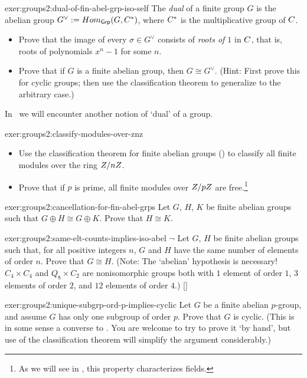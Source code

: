 \begin{exer}{}{exer:groups2:dual-of-fin-abel-grp-iso-self}
  The \emph{dual} of a finite group $G$ is the abelian group
  $G^\vee := Hom_{\textsf{Grp}}(G, C^*)$, where $C^*$ is the
  multiplicative group of $C$.
  \begin{itemize}
  \item Prove that the image of every $\sigma \in G^\vee$ consists of
    \emph{roots of $1$} in $C$, that is, roots of polynomials
    $x^n - 1$ for some $n$.
  \item Prove that if $G$ is a finite abelian group, then
    $G \cong G^\vee$. (Hint: First prove this for cyclic groups; then
    use the classification theorem to generalize to the arbitrary
    case.)
  \end{itemize}
  In~ we will encounter another
  notion of `dual' of a group.
\end{exer}
\begin{exer}{}{exer:groups2:classify-modules-over-znz}
  \begin{itemize}
  \item Use the classification theorem for finite abelian groups
    () to classify all finite modules over the
    ring $Z/nZ$.
  \item Prove that if $p$ is prime, all finite modules over $Z/pZ$
    are free.\footnote{As we will see in , this
      property characterizes fields.}
  \end{itemize}
\end{exer}
\begin{exer}{}{exer:groups2:cancellation-for-fin-abel-grps}
  Let $G$, $H$, $K$ be finite abelian groups such that
  $G \oplus H \cong G \oplus K$. Prove that $H \cong K$.
\end{exer}
\begin{exer}{}{exer:groups2:same-elt-counts-implies-iso-abel}
  $\lnot$ Let $G$, $H$ be finite abelian groups such that, for all
  positive integers $n$, $G$ and $H$ have the same number of elements
  of order $n$. Prove that $G \cong H$. (Note: The `abelian'
  hypothesis is necessary! $C_4 \times C_4$ and $Q_8 \times C_2$ are
  nonisomorphic groups both with $1$ element of order $1$, $3$
  elements of order $2$, and $12$ elements of order $4$.)
  []
\end{exer}
\begin{exer}{}{exer:groups2:unique-subgrp-ord-p-implies-cyclic}
  Let $G$ be a finite abelian $p$-group, and assume $G$ has only one
  subgroup of order $p$. Prove that $G$ is cyclic. (This is in some
  sense a converse to . You are
  welcome to try to prove it `by hand', but use of the classification
  theorem will simplify the argument considerably.)
\end{exer}
